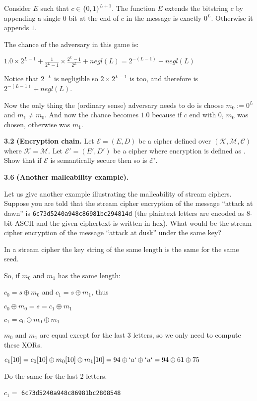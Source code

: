 \begin{tcolorbox}[solutionbox, title=Answer: (b)]
    Consider $E$ such that $c \in \{0,  1\}^{L + 1}$.
    The function $E$ extends the bitstring $c$ by appending a single $0$ bit at the end of $c$ in the message is exactly $0^L$. Otherwise it appends $1$.

    The chance of the adversary in this game is:

    $1.0 \times 2^{L-1} + \frac{1}{2^L - 1} \times \frac{2^L - 1}{2^L} + negl(L) = 2^{-(L-1)} + negl(L)$
    

    Notice that $2^{-L}$ is negligible so $2 \times 2^{L-1}$ is too, and therefore is $2^{-(L-1)} + negl(L)$.
    \vspace{1em}

    Now the only thing the (ordinary sense) adversary needs to do is choose $m_0 := 0^L$ and $m_1 \neq m_0$.
    And now the chance becomes $1.0$ because if $c$ end with $0$, $m_0$ was chosen, otherwise was $m_1$.
\end{tcolorbox}



\newpage
\noindent
\textbf{3.2}
\textbf{(Encryption chain.} Let $\mathcal{E} = (E, D)$ be a cipher defined over $(\mathcal{K},\mathcal{M},\mathcal{C})$ where $\mathcal{K} = \mathcal{M}$.
Let $\mathcal{E'} = (E', D')$ be a cipher where encryption is defined as $ $. Show that if $\mathcal{E}$ is semantically secure then so is $\mathcal{E}'$.

\begin{tcolorbox}[solutionbox, title=Answer]

\end{tcolorbox}


\newpage
\noindent
\textbf{3.6}
\textbf{(Another malleability example).}

Let us give another example illustrating the malleability of stream ciphers.
Suppose you are told that the stream cipher encryption of the message
``attack at dawn'' is
\texttt{6c73d5240a948c86981bc294814d}
(the plaintext letters are encoded as 8-bit ASCII and
the given ciphertext is written in hex).
What would be the stream cipher encryption of the message
``attack at dusk'' under the same key?
\begin{tcolorbox}[solutionbox, title=Answer]

In a stream cipher the key string of the same length is the same for the same seed.

So, if $m_0$ and $m_1$ has the same length:

$c_0 = s\oplus m_0$ and $c_1 = s \oplus m_1$, thus

$c_0 \oplus m_0 = s = c_1 \oplus m_1$

$c_1 = c_0 \oplus m_0 \oplus m_1$

$m_0$ and $m_1$ are equal except for the last 3 letters, so we only need to compute these XORs.

$c_1[10] = c_0[10] \oplus m_0[10] \oplus m_1[10] = 94 \oplus `a` \oplus `u` = 94 \oplus 61 \oplus 75$

Do the same for the last 2 letters.

$c_1 =$ \texttt{6c73d5240a948c86981bc2808548}

\end{tcolorbox}
